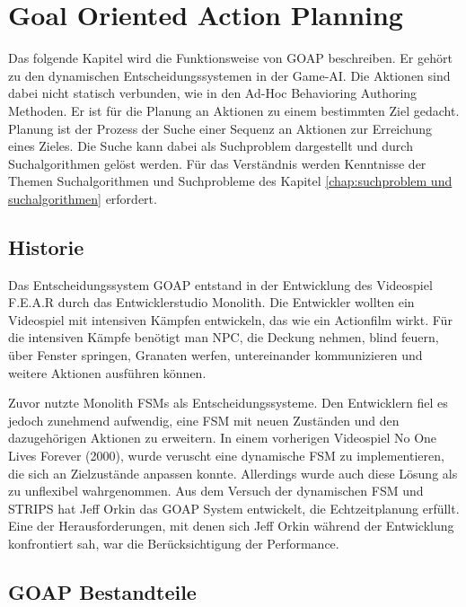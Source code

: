 \chapter{Goal Oriented Action Planning}
\label{chap:goap}

Das folgende Kapitel wird die Funktionsweise von GOAP beschreiben. Er geh\"{o}rt zu den dynamischen Entscheidungssystemen in der Game-AI. Die Aktionen sind dabei nicht statisch verbunden, wie in den Ad-Hoc Behavioring Authoring Methoden. Er ist f\"{u}r die Planung an Aktionen zu einem bestimmten Ziel gedacht. Planung ist der Prozess der Suche einer Sequenz an Aktionen zur Erreichung eines Zieles. Die Suche kann dabei als Suchproblem dargestellt und durch Suchalgorithmen gel\"{o}st werden. F\"{u}r das Verst\"{a}ndnis werden Kenntnisse der Themen Suchalgorithmen und Suchprobleme des Kapitel \ref{chap:suchproblem und suchalgorithmen} erfordert.

\section{Historie}
\label{chap:goap historie}

Das Entscheidungssystem GOAP entstand in der Entwicklung des Videospiel F.E.A.R durch das Entwicklerstudio Monolith. Die Entwickler wollten ein Videospiel mit intensiven K\"{a}mpfen entwickeln, das wie ein Actionfilm wirkt. F\"{u}r die intensiven K\"{a}mpfe ben\"{o}tigt man NPC, die Deckung nehmen, blind feuern, \"{u}ber Fenster springen, Granaten werfen, untereinander kommunizieren und weitere Aktionen ausf\"{u}hren k\"{o}nnen. \autocite{fear}

Zuvor nutzte Monolith FSMs als Entscheidungssysteme. Den Entwicklern fiel es jedoch zunehmend aufwendig, eine FSM mit neuen Zust\"{a}nden und den dazugeh\"{o}rigen Aktionen zu erweitern. In einem vorherigen Videospiel No One Lives Forever (2000), wurde veruscht eine dynamische FSM zu implementieren, die sich an Zielzust\"{a}nde anpassen konnte. Allerdings wurde auch diese L\"{o}sung als zu unflexibel wahrgenommen. Aus dem Versuch der dynamischen FSM und STRIPS hat Jeff Orkin das GOAP System entwickelt, die Echtzeitplanung erf\"{u}llt. Eine der Herausforderungen, mit denen sich Jeff Orkin w\"{a}hrend der Entwicklung konfrontiert sah, war die Ber\"{u}cksichtigung der Performance. \autocite{retro_fear}



\section{GOAP Bestandteile}
\label{chap:goap bestandteile}

